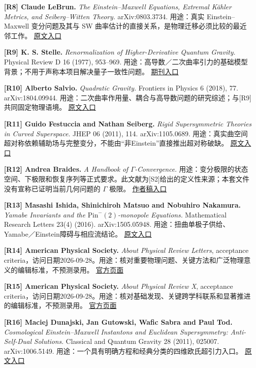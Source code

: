 \documentclass[UTF8,a4paper,11pt,fontset=fandol]{ctexart}
\begin{document}
\textbf{{[}R8{]} Claude LeBrun.} \emph{The Einstein--Maxwell Equations,
Extremal Kähler Metrics, and Seiberg--Witten Theory.} arXiv:0803.3734.
用途：真实 Einstein--Maxwell 变分问题及其与 SW
曲率估计的直接关系，是物理迁移必须比较的最近邻工作。
\href{https://arxiv.org/abs/0803.3734}{原文入口}

\textbf{{[}R9{]} K. S. Stelle.} \emph{Renormalization of
Higher-Derivative Quantum Gravity.} Physical Review D 16 (1977),
953--969.
用途：高导数／二次曲率引力的基础模型背景；不用于声称本项目解决量子一致性问题。
\href{https://doi.org/10.1103/PhysRevD.16.953}{期刊入口}

\textbf{{[}R10{]} Alberto Salvio.} \emph{Quadratic Gravity.} Frontiers
in Physics 6 (2018), 77. arXiv:1804.09944.
用途：二次曲率作用量、耦合与高导数问题的研究综述；与{[}R9{]}共同固定物理语境。
\href{https://arxiv.org/abs/1804.09944}{原文入口}

\textbf{{[}R11{]} Guido Festuccia and Nathan Seiberg.} \emph{Rigid
Supersymmetric Theories in Curved Superspace.} JHEP 06 (2011), 114.
arXiv:1105.0689.
用途：真实曲空间超对称依赖辅助场与完整变分，不能由``非Einstein''直接推出超对称破缺。
\href{https://arxiv.org/abs/1105.0689}{原文入口}

\textbf{{[}R12{]} Andrea Braides.} \emph{A Handbook of
\(\Gamma\)-Convergence.}
用途：变分极限的状态空间、下极限和恢复序列等正式要求。此文献为{[}S2{]}给出的定义性来源；本套文件没有宣称已证明当前几何问题的
\(\Gamma\) 极限。
\href{https://cvgmt.sns.it/media/doc/paper/57/Handbook.pdf}{作者稿入口}

\textbf{{[}R13{]} Masashi Ishida, Shinichiroh Matsuo and Nobuhiro
Nakamura.} \emph{Yamabe Invariants and the
\(\mathrm{Pin}^-(2)\)-monopole Equations.} Mathematical Research Letters
23(4) (2016). arXiv:1505.05948.
用途：扭曲单极子供给、Yamabe／Einstein障碍与相应流结论。
\href{https://arxiv.org/abs/1505.05948}{原文入口}

\textbf{{[}R14{]} American Physical Society.} \emph{About Physical
Review Letters}, acceptance
criteria，访问日期2026-09-28。用途：核对重要物理问题、关键方法和广泛物理意义的编辑标准，不预测录用。
\href{https://journals.aps.org/prl/about}{官方页面}

\textbf{{[}R15{]} American Physical Society.} \emph{About Physical
Review X}, acceptance
criteria，访问日期2026-09-28。用途：核对基础发现、关键跨学科联系和显著推进的编辑标准，不预测录用。
\href{https://journals.aps.org/prx/about}{官方页面}

\textbf{{[}R16{]} Maciej Dunajski, Jan Gutowski, Wafic Sabra and Paul
Tod.} \emph{Cosmological Einstein--Maxwell Instantons and Euclidean
Supersymmetry: Anti-Self-Dual Solutions.} Classical and Quantum Gravity
28 (2011), 025007. arXiv:1006.5149.
用途：一个具有明确方程和经典分类的四维欧氏超引力入口。
\href{https://arxiv.org/abs/1006.5149}{原文入口}
\end{document}
